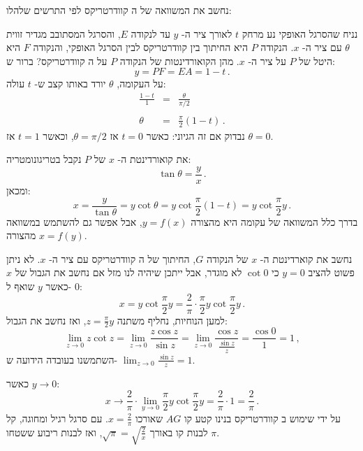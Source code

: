 \documentclass[12pt,a4paper]{article}
\newcommand*{\qd}{קוודרטריקס}
\begin{document}
נחשב את המשוואה של ה%
\qd{}
לפי התרשים שלהלו:
\begin{center}
\end{center}
נניח שהסרגל האופקי נע מרחק 
$t$
לאורך ציר ה-%
$y$
עד לנקודה
$E$,
והסרגל המסתובב מגדיר זווית 
$\theta$
עם ציר ה-%
$x$.
הנקודה 
$P$
היא החיתוך בין
\qd{}
לבין הסרגל האופקי, והנקודה
$F$
היא היטל של 
$P$
על ציר ה-%
$x$.
מהן הקואורדינטות של הנקודה 
$P$
על ה%
\qd{}?
ברור ש:
\[
y=PF=EA=1-t\,.
\]
על העקומה,
$\theta$
יורד באותו קצב ש-%
$t$
עולה:
\begin{eqnarray*}
\frac{1-t}{1} &=& \frac{\theta}{\pi/2}\\
&&\\
\theta &=&\frac{\pi}{2}(1-t)\,.
\end{eqnarray*}
נבדוק אם זה הגיוני: כאשר
$t=0$
אז
$\theta=\pi/2$,
וכאשר
$t=1$
אז
$\theta=0$.

את קואורדינטת ה-%
$x$
של
$P$
נקבל בטריגונומטריה:
\[
\tan \theta = \frac{y}{x}\,.
\]
ומכאן:
\[
x = \frac{y}{\tan\theta}=y\cot\theta=y\cot \frac{\pi}{2}(1-t)=y\cot \frac{\pi}{2}y\,.
\]
בדרך כלל המשוואה של עקומה היא מהצורה
$y=f(x)$,
אבל אפשר גם להשתמש במשוואה מהצורה
$x=f(y)$.

נחשב את קוארדינטת ה-%
$x$
של הנקודה 
$G$,
החיתוך של ה%
\qd{}
עם ציר ה-%
$x$.
לא ניתן פשוט להציב
$y=0$
כי
$\cot 0$
לא מוגדר, אבל ייתכן שיהיה לנו מזל אם נחשב את הגבול של
$x$
כאשר 
$y$
שואף ל-%
$0$:
\[
x = y\cot \frac{\pi}{2}y = \frac{2}{\pi}\cdot \frac{\pi}{2}y\cot \frac{\pi}{2}y\,.
\]
למען הנוחיות, נחליף משתנה
$z=\frac{\pi}{2}y$,
ואז נחשב את הגבול:
\[
\lim_{z\rightarrow 0} z\cot z = \lim_{z\rightarrow 0} \frac{z\cos z}{\sin z} = \lim_{z\rightarrow 0} \frac{\cos z}{\frac{\sin z}{z}} = \frac{\cos 0}{1} = 1\,,
\]
השתמשנו בעובדה הידועה ש-%
$\displaystyle\lim_{z\rightarrow 0} \frac{\sin z}{z}=1$.

כאשר
$y\rightarrow 0$:
\[
x \rightarrow \frac{2}{\pi}\cdot \lim_{y\rightarrow 0}\frac{\pi}{2}y\cot \frac{\pi}{2}y = \frac{2}{\pi}\cdot 1 = \frac{2}{\pi}\,.
\]
על ידי שימוש ב%
\qd{}
בנינו קטע קו
$AG$
שאורכו
$x=\displaystyle\frac{2}{\pi}$.
עם סרגל רגיל ומחוגה, קל לבנות קו באורך
$\sqrt{\pi}=\sqrt{\frac{2}{x}}$,
ואז לבנות ריבוע ששטחו
$\pi$.
\end{document}
